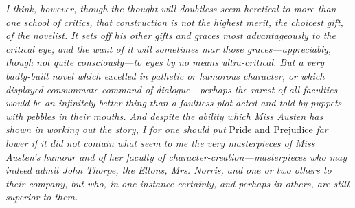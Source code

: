 \documentclass[12pt]{book}
\begin{document}
\textit{I think, however, though the thought will doubtless seem heretical to more than one school of critics, that construction is not the highest merit, the choicest gift, of the novelist. It sets off his other gifts and graces most advantageously to the critical eye; and the want of it will sometimes mar those graces---appreciably, though not quite consciously---to eyes by no means ultra-critical. But a very badly-built novel which excelled in pathetic or humorous character, or which displayed consummate command of dialogue---perhaps the rarest of all faculties---would be an infinitely better thing than a faultless plot acted and told by puppets with pebbles in their mouths. And despite the ability which Miss Austen has shown in working out the story, I for one should put} Pride and Prejudice \textit{far lower if it did not contain what seem to me the very masterpieces of Miss Austen's humour and of her faculty of character-creation---masterpieces who may indeed admit John Thorpe, the Eltons, Mrs. Norris, and one or two others to their company, but who, in one instance certainly, and perhaps in others, are still superior to them.}
\end{document}
